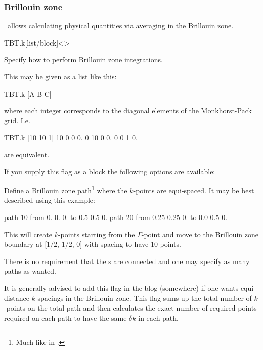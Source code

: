 \subsubsection{Brillouin zone}

\tbtrans\ allows calculating physical quantities via averaging in the
Brillouin zone. 

\begin{fdfentry}{TBT.k}[list/block]<>
  
  Specify how to perform Brillouin zone integrations.

  This may be given as a list like this:
  \begin{fdfexample}
    TBT.k [A B C]
  \end{fdfexample}
  where each integer corresponds to the diagonal elements of the
  Monkhorst-Pack grid. I.e. 
  \begin{fdfexample}
    TBT.k [10 10 1]
      10  0 0 0.
       0 10 0 0.
       0  0 1 0.
  \end{fdfexample}
  are equivalent.


  If you supply this flag as a block the following options are available:
  \begin{fdfoptions}

    \option[path]%
    
    Define a Brillouin zone path\footnote{Much like 
        in \siesta.} where the $k$-points are equi-spaced.
    It may be best described using this example:
    \begin{fdfexample}
  path 10
    from 0.  0.  0.
    to   0.5 0.5 0.
  path 20
    from 0.25 0.25 0.
    to   0.0  0.5  0.
    \end{fdfexample}

    This will create $k$-points starting from the $\Gamma$-point and
    move to the Brillouin zone boundary at [$1/2$, $1/2$, $0$] with
    spacing to have 10 points.

    There is no requirement that the s are
    connected and one may specify as many paths as wanted.

    \begin{fdfoptions}

      It is generally advised to add this flag in the blog
      (somewhere) if one wants equi-distance $k$-spacings in the
      Brillouin zone. This flag sums up the total number of $k$-points
      on the total path and then calculates the exact number of
      required points required on each path to have the same $\delta
      k$ in each path.


\end{fdfoptions}
\end{fdfoptions}
\end{fdfentry}
